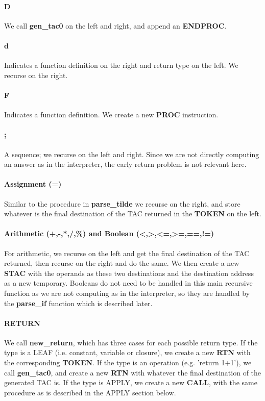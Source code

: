 \documentclass[12pt]{article}
\begin{document}
\paragraph{D} We call \textbf{gen\_tac0} on the left and right, and append an \textbf{ENDPROC}. 
\paragraph{d} Indicates a function definition on the right and return type on the left. We recurse on the right.
\paragraph{F} Indicates a function definition. We create a new \textbf{PROC} instruction.
\paragraph{;} A sequence; we recurse on the left and right. Since we are not directly computing an answer as in the interpreter, the early return problem is not relevant here. 
\paragraph{Assignment (=)} Similar to the procedure in \textbf{parse\_tilde} we recurse on the right, and store whatever is the final destination of the TAC returned in the \textbf{TOKEN} on the left.
\paragraph{Arithmetic (+,-,*,/,\%) and Boolean (<,>,<=,>=,==,!=)} For arithmetic, we recurse on the left and get the final destination of the TAC returned, then recurse on the right and do the same. We then create a new \textbf{STAC} with the operands as these two destinations and the destination address as a new temporary. Booleans do not need to be handled in this main recursive function as we are not computing as in the interpreter, so they are handled by the \textbf{parse\_if} function which is described later. 
\paragraph{RETURN} We call \textbf{new\_return}, which has three cases for each possible return type. If the type is a LEAF (i.e. constant, variable or closure), we create a new \textbf{RTN} with the corresponding \textbf{TOKEN}. If the type is an operation (e.g. 'return 1+1'), we call \textbf{gen\_tac0}, and create a new \textbf{RTN} with whatever the final destination of the generated TAC is. If the type is APPLY, we create a new \textbf{CALL}, with the same procedure as is described in the APPLY section below. 
\end{document}
